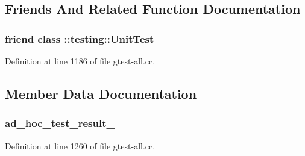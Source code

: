 \subsection{\-Friends \-And \-Related \-Function \-Documentation}
\hypertarget{classtesting_1_1internal_1_1UnitTestImpl_a893404438388dec058dc5c02e8f9a014}{
\subsubsection[{\-::testing\-::\-Unit\-Test}]{\setlength{\rightskip}{0pt plus 5cm}friend class \-::{\bf testing\-::\-Unit\-Test}}}\label{d0/de3/classtesting_1_1internal_1_1UnitTestImpl_a893404438388dec058dc5c02e8f9a014}


\-Definition at line 1186 of file gtest-\/all.\-cc.



\subsection{\-Member \-Data \-Documentation}
\hypertarget{classtesting_1_1internal_1_1UnitTestImpl_ae5fbed6752ae31d54b7db28c8a84df0a}{
\subsubsection[{ad\-\_\-hoc\-\_\-test\-\_\-result\-\_\-}]{ {\bf ad\-\_\-hoc\-\_\-test\-\_\-result\-\_\-}}}\label{d0/de3/classtesting_1_1internal_1_1UnitTestImpl_ae5fbed6752ae31d54b7db28c8a84df0a}


\-Definition at line 1260 of file gtest-\/all.\-cc.

